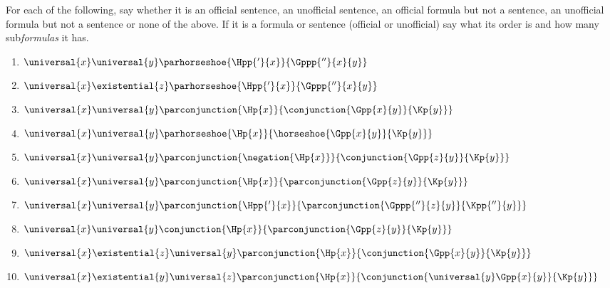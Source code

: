  For each of the following, say whether it is an official sentence, an unofficial sentence, an official formula but not a sentence, an unofficial formula but not a sentence or none of the above. 
If it is a formula or sentence (official or unofficial) say what its order is and how many sub\emph{formulas} it has.
\begin{multicols}{2}
\begin{enumerate}
\item {$\universal{\variable{x}}\universal{\variable{y}}\parhorseshoe{\Hpp{'}{\variable{x}}}{\Gppp{''}{\variable{x}}{\variable{y}}}$}
\item {$\universal{\variable{x}}\existential{\variable{z}}\parhorseshoe{\Hpp{'}{\variable{x}}}{\Gppp{''}{\variable{x}}{\variable{y}}}$}
\item {$\universal{\variable{x}}\universal{\variable{y}}\parconjunction{\Hp{\variable{x}}}{\conjunction{\Gpp{\variable{x}}{\variable{y}}}{\Kp{\variable{y}}}}$}
\item {$\universal{\variable{x}}\universal{\variable{y}}\parhorseshoe{\Hp{\variable{x}}}{\horseshoe{\Gpp{\variable{x}}{\variable{y}}}{\Kp{\variable{y}}}}$}
\item {$\universal{\variable{x}}\universal{\variable{y}}\parconjunction{\negation{\Hp{\variable{x}}}}{\conjunction{\Gpp{\variable{z}}{\variable{y}}}{\Kp{\variable{y}}}}$}
\item {$\universal{\variable{x}}\universal{\variable{y}}\parconjunction{\Hp{\variable{x}}}{\parconjunction{\Gpp{\variable{z}}{\variable{y}}}{\Kp{\variable{y}}}}$}
\item {$\universal{\variable{x}}\universal{\variable{y}}\parconjunction{\Hpp{'}{\variable{x}}}{\parconjunction{\Gppp{''}{\variable{z}}{\variable{y}}}{\Kpp{''}{\variable{y}}}}$}
\item {$\universal{\variable{x}}\universal{\variable{y}}\conjunction{\Hp{\variable{x}}}{\parconjunction{\Gpp{\variable{z}}{\variable{y}}}{\Kp{\variable{y}}}}$}
\item {$\universal{\variable{x}}\existential{\variable{z}}\universal{\variable{y}}\parconjunction{\Hp{\variable{x}}}{\conjunction{\Gpp{\variable{x}}{\variable{y}}}{\Kp{\variable{y}}}}$}
\item {$\universal{\variable{x}}\existential{\variable{y}}\universal{\variable{z}}\parconjunction{\Hp{\variable{x}}}{\conjunction{\universal{\variable{y}}\Gpp{\variable{x}}{\variable{y}}}{\Kp{\variable{y}}}}$}
\end{enumerate}
\end{multicols}

